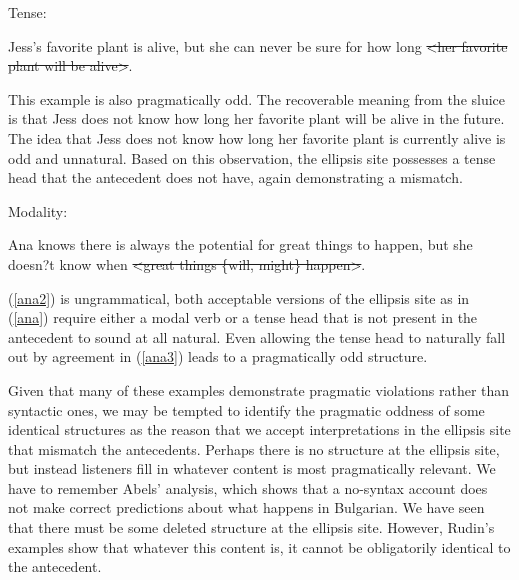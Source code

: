 \documentclass{turabian-researchpaper}
\begin{document}
Tense: 
\begin{exe}
\ex\label{jess} 
\begin{xlist}
\ex \label{jess1}Jess's favorite plant is alive, but she can never be sure for how long \sout{\textless her favorite plant will be alive\textgreater}. 
\end{xlist}
\end{exe}

This example is also pragmatically odd. The recoverable meaning from the sluice is that Jess does not know how long her favorite plant will be alive in the future. The idea that Jess does not know how long her favorite plant is currently alive is odd and unnatural. Based on this observation, the ellipsis site possesses a tense head that the antecedent does not have, again demonstrating a mismatch. 

Modality: 
\begin{exe}
\ex\label{ana} 
\begin{xlist}
\ex \label{ana1}Ana knows there is always the potential for great things to happen, but she doesn?t know when \sout{\textless great things \{will, might\} happen\textgreater}. 
\end{xlist}
\end{exe}

(\ref{ana2}) is ungrammatical, both acceptable versions of the ellipsis site as in (\ref{ana}) require either a modal verb or a tense head that is not present in the antecedent to sound at all natural. Even allowing the tense head to naturally fall out by agreement in (\ref{ana3}) leads to a pragmatically odd structure. 

Given that many of these examples demonstrate pragmatic violations rather than syntactic ones, we may be tempted to identify the pragmatic oddness of some identical structures as the reason that we accept interpretations in the ellipsis site that mismatch the antecedents. Perhaps there is no structure at the ellipsis site, but instead listeners fill in whatever content is most pragmatically relevant. We have to remember Abels' analysis, which shows that a no-syntax account does not make correct predictions about what happens in Bulgarian. We have seen that there must be some deleted structure at the ellipsis site. However, Rudin's examples show that whatever this content is, it cannot be obligatorily identical to the antecedent. 
\end{document}
